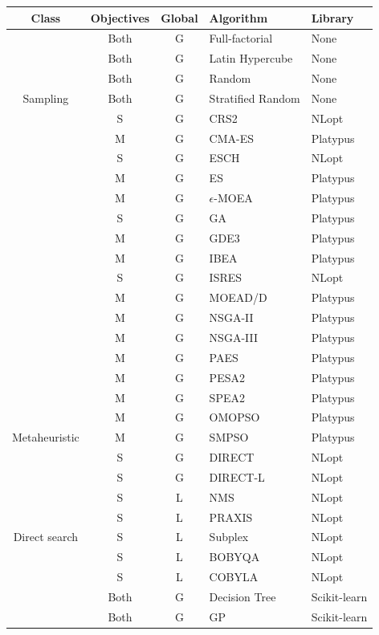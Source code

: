 \begin{table}[]
	\centering
	\begin{tabular}{cccll}
		\rowcolor[HTML]{EFEFEF} 
		\textbf{Class} & \textbf{Objectives} & \textbf{Global} & \textbf{Algorithm} & \textbf{Library} \\ \hline
		& Both & G & Full-factorial & None \\
		& Both & G & Latin Hypercube & None \\
		& Both & G & Random & None \\
		\multirow{-4}{*}{Sampling} & Both & G & Stratified Random & None \\ \hline
		& S & G & CRS2 & NLopt \\
		& M & G & CMA-ES & Platypus \\
		& S & G & ESCH & NLopt \\
		& M & G & ES & Platypus \\
		& M & G & $\epsilon$-MOEA & Platypus \\
		& S & G & GA & Platypus \\
		& M & G & GDE3 & Platypus \\
		& M & G & IBEA & Platypus \\
		& S & G & ISRES & NLopt \\
		& M & G & MOEAD/D & Platypus \\
		& M & G & NSGA-II & Platypus \\
		& M & G & NSGA-III & Platypus \\
		& M & G & PAES & Platypus \\
		& M & G & PESA2 & Platypus \\
		& M & G & SPEA2 & Platypus \\
		& M & G & OMOPSO & Platypus \\
		\multirow{-17}{*}{Metaheuristic} & M & G & SMPSO & Platypus \\ \hline
		& S & G & DIRECT & NLopt \\
		& S & G & DIRECT-L & NLopt \\
		& S & L & NMS & NLopt \\
		& S & L & PRAXIS & NLopt \\
		\multirow{-5}{*}{Direct search} & S & L & Subplex & NLopt \\ \hline
		& S & L & BOBYQA & NLopt \\
		& S & L & COBYLA & NLopt \\
		& Both & G & Decision Tree & Scikit-learn \\
		& Both & G & GP & Scikit-learn \\

\end{tabular}
\end{table}
